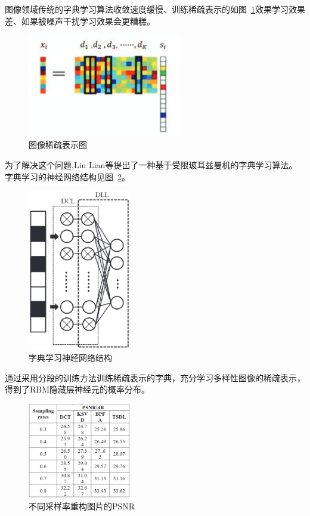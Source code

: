 \documentclass[12pt,a4paper,UTF8]{ctexart}
\begin{document}
图像领域传统的字典学习算法收敛速度缓慢、训练稀疏表示的如图~\ref{fig:图像稀疏表示图}效果学习效果差、如果被噪声干扰学习效果会更糟糕。
\begin{figure}[htpb]
    \centering
    \includegraphics[width=0.6\textwidth]{allpicture/图像稀疏表示图.eps}
    \caption{图像稀疏表示图}
    \label{fig:图像稀疏表示图}
\end{figure}
为了解决这个问题,Liu Lian等\cite{lianDictionaryLearningAlgorithm2021}提出了一种基于受限玻耳兹曼机的字典学习算法。
字典学习的神经网络结构见图~\ref{fig:字典学习神经网络结构}。
\begin{figure}[htpb]
    \centering
    \includegraphics[width=0.4\textwidth]{allpicture/字典学习神经网络结构.eps}
    \caption{字典学习神经网络结构}
    \label{fig:字典学习神经网络结构}
\end{figure}
通过采用分段的训练方法训练稀疏表示的字典，充分学习多样性图像的稀疏表示，
得到了RBM隐藏层神经元的概率分布。
\begin{figure}[htpb]
    \centering
    \includegraphics[width=0.4\textwidth]{allpicture/不同采样率重构图片的PSNR.eps}
    \caption{不同采样率重构图片的PSNR}
    \label{fig:不同采样率重构图片的PSNR}
\end{figure}
\end{document}
